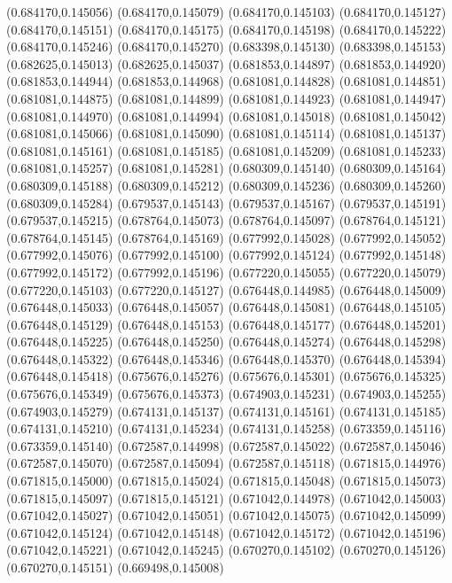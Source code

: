 (0.684170,0.145056)
(0.684170,0.145079)
(0.684170,0.145103)
(0.684170,0.145127)
(0.684170,0.145151)
(0.684170,0.145175)
(0.684170,0.145198)
(0.684170,0.145222)
(0.684170,0.145246)
(0.684170,0.145270)
(0.683398,0.145130)
(0.683398,0.145153)
(0.682625,0.145013)
(0.682625,0.145037)
(0.681853,0.144897)
(0.681853,0.144920)
(0.681853,0.144944)
(0.681853,0.144968)
(0.681081,0.144828)
(0.681081,0.144851)
(0.681081,0.144875)
(0.681081,0.144899)
(0.681081,0.144923)
(0.681081,0.144947)
(0.681081,0.144970)
(0.681081,0.144994)
(0.681081,0.145018)
(0.681081,0.145042)
(0.681081,0.145066)
(0.681081,0.145090)
(0.681081,0.145114)
(0.681081,0.145137)
(0.681081,0.145161)
(0.681081,0.145185)
(0.681081,0.145209)
(0.681081,0.145233)
(0.681081,0.145257)
(0.681081,0.145281)
(0.680309,0.145140)
(0.680309,0.145164)
(0.680309,0.145188)
(0.680309,0.145212)
(0.680309,0.145236)
(0.680309,0.145260)
(0.680309,0.145284)
(0.679537,0.145143)
(0.679537,0.145167)
(0.679537,0.145191)
(0.679537,0.145215)
(0.678764,0.145073)
(0.678764,0.145097)
(0.678764,0.145121)
(0.678764,0.145145)
(0.678764,0.145169)
(0.677992,0.145028)
(0.677992,0.145052)
(0.677992,0.145076)
(0.677992,0.145100)
(0.677992,0.145124)
(0.677992,0.145148)
(0.677992,0.145172)
(0.677992,0.145196)
(0.677220,0.145055)
(0.677220,0.145079)
(0.677220,0.145103)
(0.677220,0.145127)
(0.676448,0.144985)
(0.676448,0.145009)
(0.676448,0.145033)
(0.676448,0.145057)
(0.676448,0.145081)
(0.676448,0.145105)
(0.676448,0.145129)
(0.676448,0.145153)
(0.676448,0.145177)
(0.676448,0.145201)
(0.676448,0.145225)
(0.676448,0.145250)
(0.676448,0.145274)
(0.676448,0.145298)
(0.676448,0.145322)
(0.676448,0.145346)
(0.676448,0.145370)
(0.676448,0.145394)
(0.676448,0.145418)
(0.675676,0.145276)
(0.675676,0.145301)
(0.675676,0.145325)
(0.675676,0.145349)
(0.675676,0.145373)
(0.674903,0.145231)
(0.674903,0.145255)
(0.674903,0.145279)
(0.674131,0.145137)
(0.674131,0.145161)
(0.674131,0.145185)
(0.674131,0.145210)
(0.674131,0.145234)
(0.674131,0.145258)
(0.673359,0.145116)
(0.673359,0.145140)
(0.672587,0.144998)
(0.672587,0.145022)
(0.672587,0.145046)
(0.672587,0.145070)
(0.672587,0.145094)
(0.672587,0.145118)
(0.671815,0.144976)
(0.671815,0.145000)
(0.671815,0.145024)
(0.671815,0.145048)
(0.671815,0.145073)
(0.671815,0.145097)
(0.671815,0.145121)
(0.671042,0.144978)
(0.671042,0.145003)
(0.671042,0.145027)
(0.671042,0.145051)
(0.671042,0.145075)
(0.671042,0.145099)
(0.671042,0.145124)
(0.671042,0.145148)
(0.671042,0.145172)
(0.671042,0.145196)
(0.671042,0.145221)
(0.671042,0.145245)
(0.670270,0.145102)
(0.670270,0.145126)
(0.670270,0.145151)
(0.669498,0.145008)
